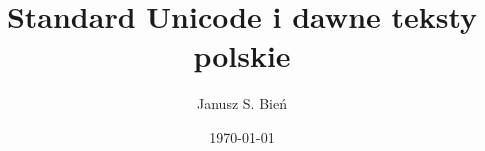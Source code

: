 \documentclass{mwart}
\begin{document}
\gappto\captionspolish{\renewcommand{\figurename}{Ilustracja}}

\renewcommand{\topfraction}{0.9}	
\setcounter{topnumber}{4}
\setcounter{totalnumber}{4}

% 
\title{Standard Unicode i dawne teksty polskie}

\author{Janusz S. Bień}

\date{\today}

\maketitle




\end{document}
